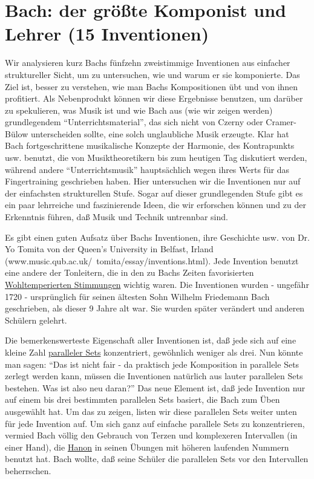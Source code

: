 
\section{Bach: der größte Komponist und Lehrer (15 Inventionen)}
\label{c1iii20} 

Wir analysieren kurz Bachs fünfzehn zweistimmige Inventionen aus einfacher struktureller Sicht, um zu untersuchen, wie und warum er sie komponierte.
Das Ziel ist, besser zu verstehen, wie man Bachs Kompositionen übt und von ihnen profitiert.
Als Nebenprodukt können wir diese Ergebnisse benutzen, um darüber zu spekulieren, was Musik ist und wie Bach aus (wie wir zeigen werden) grundlegendem \enquote{Unterrichtsmaterial}, das sich nicht von Czerny oder Cramer-Bülow unterscheiden sollte, eine solch unglaubliche Musik erzeugte.
Klar hat Bach fortgeschrittene musikalische Konzepte der Harmonie, des Kontrapunkts usw. benutzt, die von Musiktheoretikern bis  zum heutigen Tag diskutiert werden, während andere \enquote{Unterrichtsmusik} hauptsächlich wegen ihres Werts für das Fingertraining geschrieben haben.
Hier untersuchen wir die Inventionen nur auf der einfachsten strukturellen Stufe.
Sogar auf dieser grundlegenden Stufe gibt es ein paar lehrreiche und faszinierende Ideen, die wir erforschen können und zu der Erkenntnis führen, daß Musik und Technik untrennbar sind.
 
Es gibt einen guten Aufsatz über Bachs Inventionen, ihre Geschichte usw. von Dr. Yo Tomita von der Queen's University in Belfast, Irland (www.music.qub.ac.uk/~tomita/essay/inventions.html).
Jede Invention benutzt eine andere der Tonleitern, die in den zu Bachs Zeiten favorisierten \hyperref[c2_2_wtk2]{Wohltemperierten Stimmungen} wichtig waren.
Die Inventionen wurden - ungefähr 1720 - ursprünglich für seinen ältesten Sohn Wilhelm Friedemann Bach geschrieben, als dieser 9 Jahre alt war.
Sie wurden später verändert und anderen Schülern gelehrt.

Die bemerkenswerteste Eigenschaft aller Inventionen ist, daß jede sich auf eine kleine Zahl \hyperref[c1iii7b]{paralleler Sets} konzentriert, gewöhnlich weniger als drei.
Nun könnte man sagen: \enquote{Das ist nicht fair - da praktisch jede Komposition in parallele Sets zerlegt werden kann, müssen die Inventionen natürlich aus lauter parallelen Sets bestehen. Was ist also neu daran?}
Das neue Element ist, daß jede Invention nur auf einem bis drei bestimmten parallelen Sets basiert, die Bach zum Üben ausgewählt hat.
Um das zu zeigen, listen wir diese parallelen Sets weiter unten für jede Invention auf.
Um sich ganz auf einfache parallele Sets zu konzentrieren, vermied Bach völlig den Gebrauch von Terzen und komplexeren Intervallen (in einer Hand), die \hyperref[c1iii7h]{Hanon} in seinen Übungen mit höheren laufenden Nummern benutzt hat.
Bach wollte, daß seine Schüler die parallelen Sets vor den Intervallen beherrschen.

